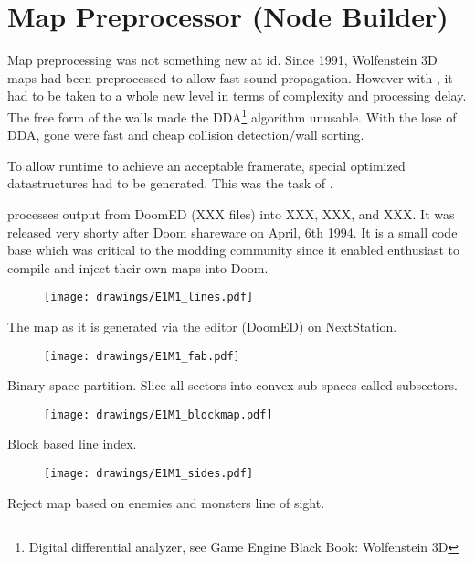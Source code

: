 \section{Map Preprocessor (Node Builder)}
Map preprocessing was not something new at id. Since 1991, Wolfenstein 3D maps had been preprocessed to allow fast sound propagation. However with \doom, it had to be taken to a whole new level in terms of complexity and processing delay. The free form of the walls made the DDA\footnote{Digital differential analyzer, see Game Engine Black Book: Wolfenstein 3D} algorithm unusable. With the lose of DDA, gone were fast and cheap collision detection/wall sorting.\\
\par
To allow runtime to achieve an acceptable framerate, special optimized datastructures had to be generated. This was the task of 
.\\
\par
 processes output from DoomED (XXX files) into XXX, XXX, and XXX. It was released very shorty after Doom shareware on April, 6th 1994. It is a small code base which was critical to the modding community since it enabled enthusiast to compile and inject their own maps into Doom.\\
\par
{}
\par
{}




\pagebreak
\par
\begin{figure}[H]
\centering
\texttt{[image: drawings/E1M1\_lines.pdf]}
\end{figure}
\par
The map as it is generated via the editor (DoomED) on NextStation.\\
\par
\begin{figure}[H]
\centering
\texttt{[image: drawings/E1M1\_fab.pdf]}
\end{figure}
\par
Binary space partition. Slice all sectors into convex sub-spaces called subsectors.\\
\par
\begin{figure}[H]
\centering
\texttt{[image: drawings/E1M1\_blockmap.pdf]}
\end{figure}
\par
Block based line index.\\
\par
\begin{figure}[H]
\centering
\texttt{[image: drawings/E1M1\_sides.pdf]}
\end{figure}
\par
Reject map based on enemies and monsters line of sight.\\


